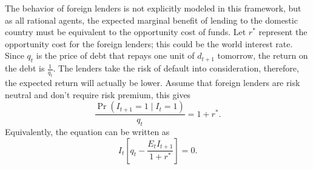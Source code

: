 The behavior of foreign lenders is not explicitly modeled in this framework, but as all rational agents, the expected marginal benefit of lending to the domestic country must be equivalent to the opportunity cost of funds.
Let $r^*$ represent the opportunity cost for the foreign lenders; this could be the world interest rate. Since $q_t$ is the price of debt that repays one unit of $d_{t+1}$ tomorrow, the return on the debt is $\frac{1}{q_t}$. The lenders take the risk of default into consideration, therefore, the expected return will actually be lower. Assume that foreign lenders are risk neutral and don't require risk premium, this gives
\begin{equation}
    \label{eq:lender}
    \frac{\Pr(I_{t+1}=1 \mid I_{t}=1)}{q_t} = 1 + r^* .
\end{equation}
Equivalently, the equation can be written as
\begin{equation*}
    I_t \left[ q_t - \frac{E_t I_{t+1}}{1+r^*} \right] = 0.
\end{equation*}
